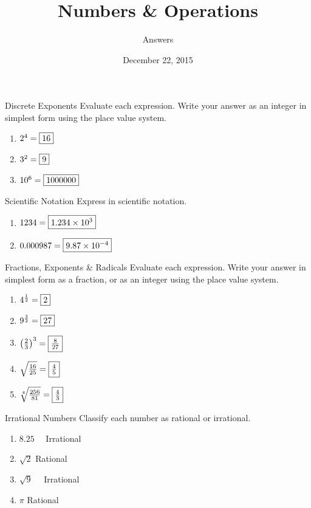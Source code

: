 \documentclass[12pt,letterpaper]{article}
\title{Numbers \& Operations}
\author{Answers}
\date{December 22, 2015}
\begin{document}
\maketitle

\thispagestyle{empty}

\begin{problem}{Discrete Exponents}
 Evaluate each expression. Write your answer as an integer in simplest form
 using the place value system.

 \begin{enumerate}[\hspace{.5cm}a.]
  \item $2^4=\framebox{$16$}$
  \item $3^2=\framebox{$9$}$
  \item $10^6=\framebox{$1000000$}$
 \end{enumerate}
\end{problem}

\begin{problem}{Scientific Notation}
 Express in scientific notation.

 \begin{enumerate}[\hspace{.5cm}a.]
  \item \( 1234=\framebox{$1.234\times{10}^3$} \)
  \item \( 0.000987=\framebox{$9.87\times{10}^{-4}$} \)
 \end{enumerate}
\end{problem}

\begin{problem}{Fractions, Exponents \& Radicals}
 Evaluate each expression. Write your answer in simplest form as a fraction, or
 as an integer using the place value system.

 \begin{enumerate}[\hspace{.5cm}a.]
  \item $4^{\frac{1}{2}}=\framebox{$2$}$
  \item $9^{\frac{3}{2}}=\framebox{$27$}$
  \item ${\left(\frac{2}{3}\right)}^3=\framebox{$\frac{8}{27}$}$
  \item $\sqrt{\frac{16}{25}}=\framebox{$\frac{4}{5}$}$
  \item $\sqrt[4]{\frac{256}{81}}=\framebox{$\frac{4}{3}$}$
 \end{enumerate}
\end{problem}

\begin{problem}{Irrational Numbers}
 Classify each number as rational or irrational.

 \begin{enumerate}[\hspace{.5cm}a.]
  \item $8.25$ \hfill {}~~Irrational
  \item $\sqrt{2}$ \hfill Rational~~
  \item $\sqrt{9}$ \hfill {}~~Irrational
  \item $\pi$ \hfill Rational~~
 \end{enumerate}
\end{problem}
\end{document}

